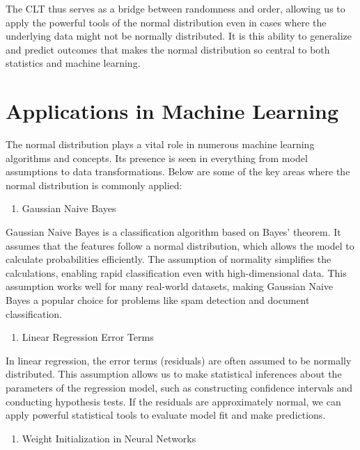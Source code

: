 \documentclass[
  12 pt,
  a4paper,
]{book}
\providecommand{\tightlist}{%
  \setlength{\itemsep}{0pt}\setlength{\parskip}{0pt}}
\numberwithin{equation}{section}
\theoremstyle{plain}      %
\theoremstyle{definition} %
\theoremstyle{remark}     %
\theoremstyle{note}         %
\begin{document}
The CLT thus serves as a bridge between randomness and order, allowing
us to apply the powerful tools of the normal distribution even in cases
where the underlying data might not be normally distributed. It is this
ability to generalize and predict outcomes that makes the normal
distribution so central to both statistics and machine learning.

\hypertarget{applications-in-machine-learning}{%
\section{Applications in Machine
Learning}\label{applications-in-machine-learning}}

The normal distribution plays a vital role in numerous machine learning
algorithms and concepts. Its presence is seen in everything from model
assumptions to data transformations. Below are some of the key areas
where the normal distribution is commonly applied:

\begin{enumerate}
\def\labelenumi{\arabic{enumi}.}
\tightlist
\item
  Gaussian Naive Bayes
\end{enumerate}

Gaussian Naive Bayes is a classification algorithm based on Bayes'
theorem. It assumes that the features follow a normal distribution,
which allows the model to calculate probabilities efficiently. The
assumption of normality simplifies the calculations, enabling rapid
classification even with high-dimensional data. This assumption works
well for many real-world datasets, making Gaussian Naive Bayes a popular
choice for problems like spam detection and document classification.

\begin{enumerate}
\def\labelenumi{\arabic{enumi}.}
\setcounter{enumi}{1}
\tightlist
\item
  Linear Regression Error Terms
\end{enumerate}

In linear regression, the error terms (residuals) are often assumed to
be normally distributed. This assumption allows us to make statistical
inferences about the parameters of the regression model, such as
constructing confidence intervals and conducting hypothesis tests. If
the residuals are approximately normal, we can apply powerful
statistical tools to evaluate model fit and make predictions.

\begin{enumerate}
\def\labelenumi{\arabic{enumi}.}
\setcounter{enumi}{2}
\tightlist
\item
  Weight Initialization in Neural Networks
\end{enumerate}
\end{document}
